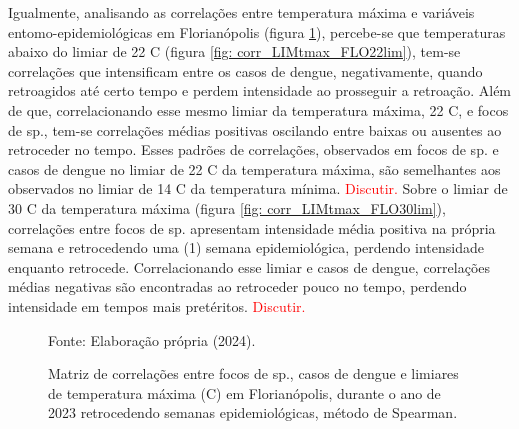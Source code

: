 \documentclass[
	12pt,				%
	openright,			%
	oneside,			%
	a4paper,			%
	english,			%
	french,				%
	spanish,			%
	brazil				%
	dvipsnames, table]{abntex2}
\begin{document}
\indent Igualmente, analisando as correlações entre temperatura máxima e variáveis entomo-epidemiológicas em Florianópolis (figura \ref{fig: matriz_corr_LIMtmax_FLO}), percebe-se que temperaturas abaixo do limiar de 22 C (figura \ref{fig: corr_LIMtmax_FLO22lim}), tem-se correlações que intensificam entre os casos de dengue, negativamente, quando retroagidos até certo tempo e perdem intensidade ao prosseguir a retroação. Além de que, correlacionando esse mesmo limiar da temperatura máxima, 22 C, e focos de  sp., tem-se correlações médias positivas oscilando entre baixas ou ausentes ao retroceder no tempo. Esses padrões de correlações, observados em focos de  sp. e casos de dengue no limiar de 22 C da temperatura máxima, são semelhantes aos observados no limiar de 14 C da temperatura mínima. \textcolor{red}{Discutir.} Sobre o limiar de 30 C da temperatura máxima (figura \ref{fig: corr_LIMtmax_FLO30lim}), correlações entre focos de  sp. apresentam intensidade média positiva na própria semana e retrocedendo uma (1) semana epidemiológica, perdendo intensidade enquanto retrocede. Correlacionando esse limiar e casos de dengue, correlações médias negativas são encontradas ao retroceder pouco no tempo, perdendo intensidade em tempos mais pretéritos. \textcolor{red}{Discutir.}

\begin{figure}[htbp]
    \begin{center}
    \caption{Matriz de correlações entre focos de  sp., casos de dengue e limiares de temperatura máxima (C) em Florianópolis, durante o ano de 2023 retrocedendo semanas epidemiológicas, método de Spearman.}
    \label{fig: matriz_corr_LIMtmax_FLO}
        \hfill
    \end{center}
    \small{Fonte: Elaboração própria (2024).}
\end{figure}

\end{document}
